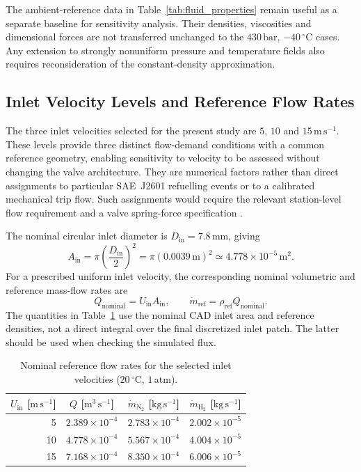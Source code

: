 The ambient-reference data in Table~\ref{tab:fluid_properties} remain useful as a separate baseline for sensitivity analysis. Their densities, viscosities and dimensional forces are not transferred unchanged to the $430\,\mathrm{bar}$, $-40\,^{\circ}\mathrm{C}$ cases. Any extension to strongly nonuniform pressure and temperature fields also requires reconsideration of the constant-density approximation.

\subsection{Inlet Velocity Levels and Reference Flow Rates}
The three inlet velocities selected for the present study are $5$, $10$ and $15\,\mathrm{m\,s^{-1}}$. These levels provide three distinct flow-demand conditions with a common reference geometry, enabling sensitivity to velocity to be assessed without changing the valve architecture. They are numerical factors rather than direct assignments to particular SAE~J2601 refuelling events or to a calibrated mechanical trip flow. Such assignments would require the relevant station-level flow requirement and a valve spring-force specification \cite{sae_j2601}.

The nominal circular inlet diameter is $D_{\mathrm{in}}=7.8\,\mathrm{mm}$, giving
\begin{equation}
    A_{\mathrm{in}}=\pi\left(\frac{D_{\mathrm{in}}}{2}\right)^2
    =\pi(0.0039\,\mathrm{m})^2\simeq4.778\times10^{-5}\,\mathrm{m^2}.
    \label{eq:inlet_area}
\end{equation}
For a prescribed uniform inlet velocity, the corresponding nominal volumetric and reference mass-flow rates are
\begin{equation}
    Q_{\mathrm{nominal}}=U_{\mathrm{in}}A_{\mathrm{in}},
    \qquad
    \dot m_{\mathrm{ref}}=\rho_{\mathrm{ref}}Q_{\mathrm{nominal}}.
    \label{eq:inlet_flow}
\end{equation}
The quantities in Table~\ref{tab:flow_regimes} use the nominal CAD inlet area and reference densities, not a direct integral over the final discretized inlet patch. The latter should be used when checking the simulated flux.

\begin{table}[htbp]
\centering
\small
\begin{tabular}{@{}rccc@{}}
\toprule
$U_{\mathrm{in}}$ [$\mathrm{m\,s^{-1}}$] &
$Q$ [$\mathrm{m^3\,s^{-1}}$] &
$\dot m_{\mathrm{N}_2}$ [$\mathrm{kg\,s^{-1}}$] &
$\dot m_{\mathrm{H}_2}$ [$\mathrm{kg\,s^{-1}}$]\\
\midrule
5  & $2.389\times10^{-4}$ & $2.783\times10^{-4}$ & $2.002\times10^{-5}$\\
10 & $4.778\times10^{-4}$ & $5.567\times10^{-4}$ & $4.004\times10^{-5}$\\
15 & $7.168\times10^{-4}$ & $8.350\times10^{-4}$ & $6.006\times10^{-5}$\\
\bottomrule
\end{tabular}
\caption{Nominal reference flow rates for the selected inlet velocities ($20\,^{\circ}\mathrm{C}$, $1\,\mathrm{atm}$).}
\label{tab:flow_regimes}

\end{table}

